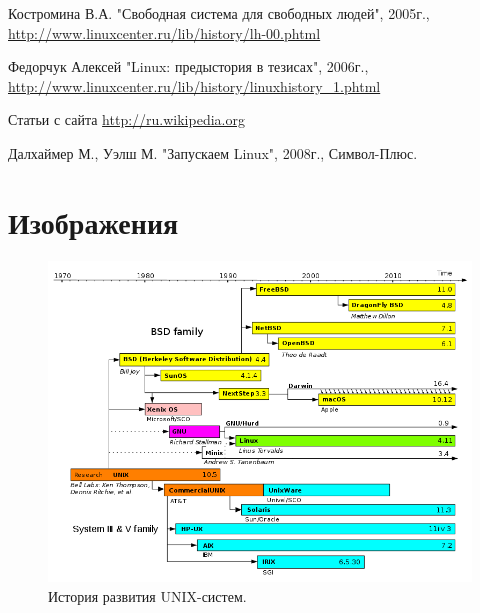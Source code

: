 \documentclass[bachelor, och, referat, times]{SCWorks}
\begin{document}
\begin{thebibliography}{99}
	 Костромина В.А. "Свободная система для свободных людей", 2005г.,
	\href{http://www.linuxcenter.ru/lib/history/lh-00.phtml}{http://www.linuxcenter.ru/lib/history/lh-00.phtml}
	
	 Федорчук Алексей "Linux: предыстория в тезисах", 2006г.,
	\href{http://www.linuxcenter.ru/lib/history/linuxhistory_1.phtml}{http://www.linuxcenter.ru/lib/history/linuxhistory\_1.phtml}
	
	 Статьи с сайта
	\href{http://ru.wikipedia.org}{http://ru.wikipedia.org}
	
	 Далхаймер М., Уэлш М. "Запускаем Linux", 2008г., Символ-Плюс.
	
\end{thebibliography}


\appendix

\section{Изображения}

\begin{figure}[h]
    \centering
    \includegraphics[width=1\textwidth]{790px-Unix_timeline.png}
    \caption{История развития UNIX-систем.}
    \label{fig:hist}
\end{figure}
\end{document}

